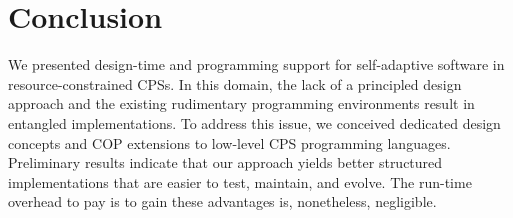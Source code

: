 \section{Conclusion}
\label{sec:ending}

We presented design-time and programming support for self-adaptive
software in resource-constrained CPSs. In this domain, the lack of a
principled design approach and the existing rudimentary programming
environments result in entangled implementations. To address this
issue, we conceived dedicated design concepts and COP extensions to
low-level CPS programming languages. Preliminary results indicate that
our approach yields better structured implementations that are easier
to test, maintain, and evolve. The run-time overhead to pay is to gain
these advantages is, nonetheless, negligible.

